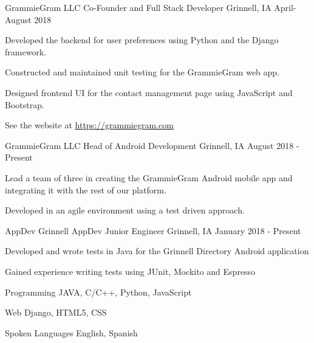 \documentclass[12pt, a4paper]{awesome-cv}
\begin{document}
\begin{cventries}
  \cventry
    {GrammieGram LLC}
    {Co-Founder and Full Stack Developer}
    {Grinnell, IA}
    {April-August 2018}
    {
      \begin{cvitems}
        \item {Developed the backend for user preferences using Python and the Django framework.}
        \item {Constructed and maintained unit testing for the GrammieGram web app.}
        \item {Designed frontend UI for the contact management page using JavaScript and Bootstrap.}
	\item {See the website at \underline{\href{https://grammiegram.com}{https://grammiegram.com}}}
      \end{cvitems}
    }

  \cventry
    {GrammieGram LLC}
    {Head of Android Development}
    {Grinnell, IA}
    {August 2018 - Present}
    {
      \begin{cvitems}
        \item {Lead a team of three in creating the GrammieGram Android mobile app and integrating it with the rest of our platform.}
	\item {Developed in an agile environment using a test driven approach.}
      \end{cvitems}
    }

  \cventry
    {AppDev Grinnell}
    {AppDev Junior Engineer}
    {Grinnell, IA}
    {January 2018 - Present}
    {
      \begin{cvitems}
        \item {Developed and wrote tests in Java for the Grinnell Directory Android application}
	\item {Gained experience writing tests using JUnit, Mockito and Espresso}
      \end{cvitems}
    }

\end{cventries}


\begin{cvskills}
  \cvskill
    {Programming} 
    {JAVA, C/C++, Python, JavaScript} 

  \cvskill
    {Web} 
    {Django, HTML5, CSS} 


  \cvskill
    {Spoken Languages} 
    {English, Spanish} 

\end{cvskills}
\end{document}

